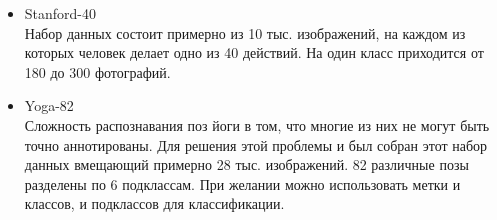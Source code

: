 \begin{itemize}
	\item Stanford-40\\
	Набор данных состоит примерно из 10 тыс. изображений, на каждом из которых человек делает одно из 40 действий. На один класс приходится от 180 до 300 фотографий. \cite{stanford40}
	\item Yoga-82\\
	Сложность распознавания поз йоги в том, что многие из них не могут быть точно аннотированы. Для решения этой проблемы и был собран этот набор данных вмещающий примерно 28 тыс. изображений. 82 различные позы разделены по 6 подклассам. При желании можно использовать метки и классов, и подклассов для классификации. \cite{verma2020yoga}
\end{itemize}

